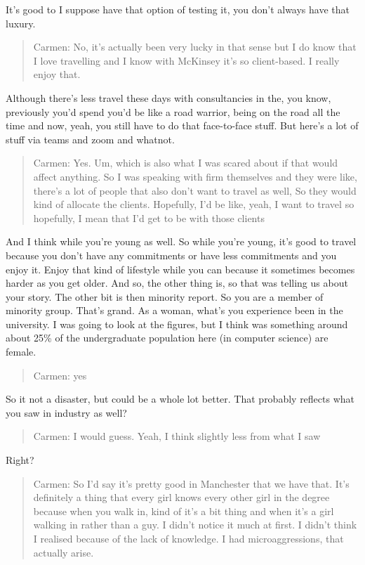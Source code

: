 \documentclass[
]{book}
\begin{document}
It's good to I suppose have that option of testing it, you don't always have that luxury.

\begin{quote}
Carmen: No, it's actually been very lucky in that sense but I do know that I love travelling and I know with McKinsey it's so client-based. I really enjoy that.
\end{quote}

Although there's less travel these days with consultancies in the, you know, previously you'd spend you'd be like a road warrior, being on the road all the time and now, yeah, you still have to do that face-to-face stuff. But here's a lot of stuff via teams and zoom and whatnot.

\begin{quote}
Carmen: Yes. Um, which is also what I was scared about if that would affect anything. So I was speaking with firm themselves and they were like, there's a lot of people that also don't want to travel as well, So they would kind of allocate the clients. Hopefully, I'd be like, yeah, I want to travel so hopefully, I mean that I'd get to be with those clients
\end{quote}

And I think while you're young as well. So while you're young, it's good to travel because you don't have any commitments or have less commitments and you enjoy it. Enjoy that kind of lifestyle while you can because it sometimes becomes harder as you get older. And so, the other thing is, so that was telling us about your story. The other bit is then minority report. So you are a member of minority group. That's grand. As a woman, what's you experience been in the university. I was going to look at the figures, but I think was something around about 25\% of the undergraduate population here (in computer science) are female.

\begin{quote}
Carmen: yes
\end{quote}

So it not a disaster, but could be a whole lot better. That probably reflects what you saw in industry as well?

\begin{quote}
Carmen: I would guess. Yeah, I think slightly less from what I saw
\end{quote}

Right?

\begin{quote}
Carmen: So I'd say it's pretty good in Manchester that we have that. It's definitely a thing that every girl knows every other girl in the degree because when you walk in, kind of it's a bit thing and when it's a girl walking in rather than a guy. I didn't notice it much at first. I didn't think I realised because of the lack of knowledge. I had microaggressions, that actually arise.
\end{quote}
\end{document}

